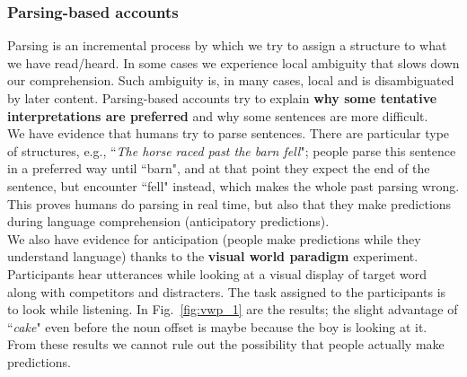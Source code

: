 \subsubsection{Parsing-based accounts}
Parsing is an incremental process by which we try to assign a structure to what we have read/heard. In some cases we experience local ambiguity that slows down our comprehension. Such ambiguity is, in many cases, local and is disambiguated by later content. Parsing-based accounts try to explain \textbf{why some tentative interpretations are preferred} and why some sentences are more difficult.\\

We have evidence that humans try to parse sentences. There are particular type of structures, e.g., ``\textit{The horse raced past the barn fell}"; people parse this sentence in a preferred way until ``barn", and at that point they expect the end of the sentence, but encounter ``fell" instead, which makes the whole past parsing wrong. This proves humans do parsing in real time, but also that they make predictions during language comprehension (anticipatory predictions).\\

We also have evidence for anticipation (people make predictions while they understand language) thanks to the \textbf{visual world paradigm} experiment. Participants hear utterances while looking at a visual display of target word along with competitors and distracters. The task assigned to the participants is to look while listening. In Fig.~\ref{fig:vwp_1} are the results; the slight advantage of ``\textit{cake}" even before the noun offset is maybe because the boy is looking at it. From these results we cannot rule out the possibility that people actually make predictions.

